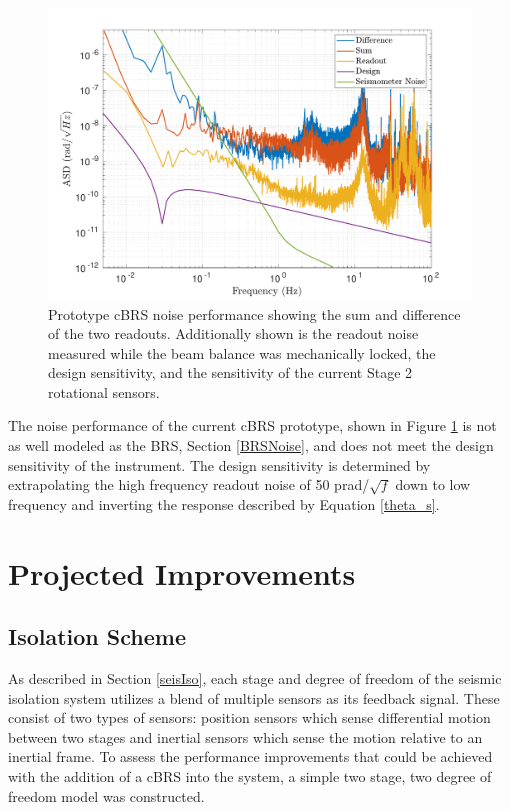 \documentclass [12pt, proquest]{uwthesis}[2019]
\begin{document}
\begin{figure}[!h]
\begin{center}
 \includegraphics[width=\textwidth]{cBRS_Noise.pdf}
\caption[Prototype cBRS noise performance]{Prototype cBRS noise performance showing the sum and difference of the two readouts. Additionally shown is the readout noise measured while the beam balance was mechanically locked, the design sensitivity, and the sensitivity of the current Stage 2 rotational sensors.}
\label{cBRS_noise}
\end{center}
\end{figure}

The noise performance of the current cBRS prototype, shown in Figure \ref{cBRS_noise} is not as well modeled as the BRS, Section \ref{BRSNoise}, and does not meet the design sensitivity of the instrument. The design sensitivity is determined by extrapolating the high frequency readout noise of 50 prad/$\sqrt{f}$ down to low frequency and inverting the response described by Equation \ref{theta_s}.


\section{Projected Improvements}
\subsection{Isolation Scheme} \label{IsoScheme}

As described in Section \ref{seisIso}, each stage and degree of freedom of the seismic isolation system utilizes a blend of multiple sensors as its feedback signal. These consist of two types of sensors: position sensors which sense differential motion between two stages and inertial sensors which sense the motion relative to an inertial frame. To assess the performance improvements that could be achieved with the addition of a cBRS into the system, a simple two stage, two degree of freedom model was constructed. 
\end{document}
